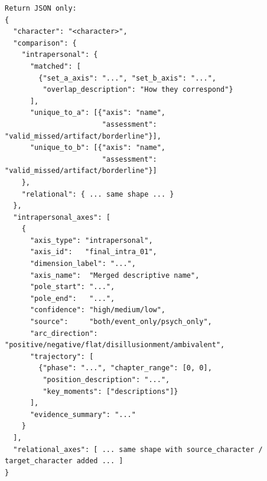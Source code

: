 \documentclass{llmxive}
\begin{document}
\begin{table}[htbp]
\begin{lstlisting}[basicstyle=\ttfamily\scriptsize]
Return JSON only:
{
  "character": "<character>",
  "comparison": {
    "intrapersonal": {
      "matched": [
        {"set_a_axis": "...", "set_b_axis": "...",
         "overlap_description": "How they correspond"}
      ],
      "unique_to_a": [{"axis": "name",
                       "assessment": "valid_missed/artifact/borderline"}],
      "unique_to_b": [{"axis": "name",
                       "assessment": "valid_missed/artifact/borderline"}]
    },
    "relational": { ... same shape ... }
  },
  "intrapersonal_axes": [
    {
      "axis_type": "intrapersonal",
      "axis_id":   "final_intra_01",
      "dimension_label": "...",
      "axis_name":  "Merged descriptive name",
      "pole_start": "...",
      "pole_end":   "...",
      "confidence": "high/medium/low",
      "source":     "both/event_only/psych_only",
      "arc_direction": "positive/negative/flat/disillusionment/ambivalent",
      "trajectory": [
        {"phase": "...", "chapter_range": [0, 0],
         "position_description": "...",
         "key_moments": ["descriptions"]}
      ],
      "evidence_summary": "..."
    }
  ],
  "relational_axes": [ ... same shape with source_character / target_character added ... ]
}
\end{lstlisting}
\caption{Stage~ii cross-stream reconciliation prompt.}
\label{tab:prompt-cross-stream}
\end{table}
\end{document}
